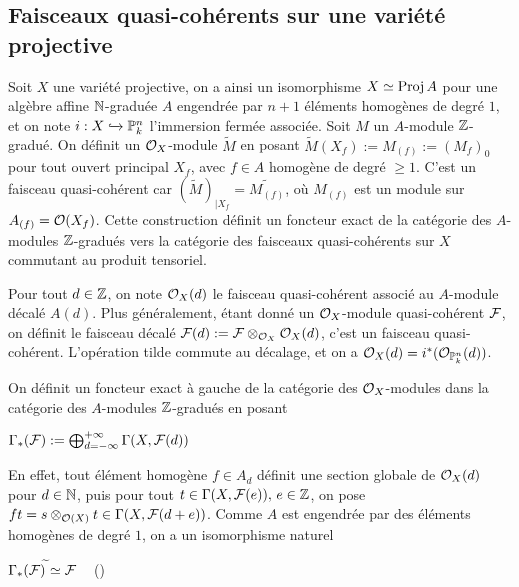 \subsection{Faisceaux quasi-cohérents sur une variété projective}

\label{FQCProj}

Soit $X$ une variété projective, on a ainsi un isomorphisme $X\simeq\operatorname{Proj} A$ pour une algèbre affine $\mathbb{N}$-graduée $A$ engendrée par $n+1$ éléments homogènes de degré $1$, et on note $i:X\xhookrightarrow{} \mathbb{P}_k^n$ l'immersion fermée associée. Soit $M$ un $A$-module $\mathbb{Z}$-gradué. On définit un $\mathcal{O}_X$-module $\widetilde{M}$ en posant $\widetilde{M}(X_f):=M_{(f)}:=(M_f)_0$ pour tout ouvert principal $X_f$, avec $f\in A$ homogène de degré $\geq 1$. C'est un faisceau quasi-cohérent car $(\widetilde{M})_{|X_f}=\widetilde{M_{(f)}}$, où $M_{(f)}$ est un module sur $A_{(f)}=\mathcal{O}(X_f)$. Cette construction définit un foncteur exact de la catégorie des $A$-modules $\mathbb{Z}$-gradués vers la catégorie des faisceaux quasi-cohérents sur $X$ commutant au produit tensoriel.

Pour tout $d\in \mathbb{Z}$, on note $\mathcal{O}_X(d)$ le faisceau quasi-cohérent associé au $A$-module décalé $A(d)$. Plus généralement, étant donné un $\mathcal{O}_X$-module quasi-cohérent $\mathcal{F}$, on définit le faisceau décalé $\mathcal{F}(d):=\mathcal{F}\otimes_{\mathcal{O}_X}\mathcal{O}_X(d)$, c'est un faisceau quasi-cohérent. L'opération tilde commute au décalage, et on a $\mathcal{O}_X(d)=i^*(\mathcal{O}_{\mathbb{P}_k^n}(d))$.

On définit un foncteur exact à gauche de la catégorie des $\mathcal{O}_X$-modules dans la catégorie des $A$-modules $\mathbb{Z}$-gradués en posant 
\begin{center}
$\Gamma_*(\mathcal{F}):=\bigoplus_{d=-\infty}^{+\infty}\Gamma(X,\mathcal{F}(d))$
\end{center}
En effet, tout élément homogène $f\in A_d$ définit une section globale de $\mathcal{O}_X(d)$ pour $d\in \mathbb{N}$, puis pour tout $t\in \Gamma(X,\mathcal{F}(e)),\, e\in\mathbb{Z}$, on pose $ft=s\otimes_{\mathcal{O}(X)} t\in \Gamma(X, \mathcal{F}(d+e))$. Comme $A$ est engendrée par des éléments homogènes de degré $1$, on a un isomorphisme naturel 
\begin{center}
$\Gamma_*(\mathcal{F})^{\widetilde{}}\simeq \mathcal{F}\,\,\,\,\,$ (\cite[II.5.15]{Hartshorne})\end{center}

